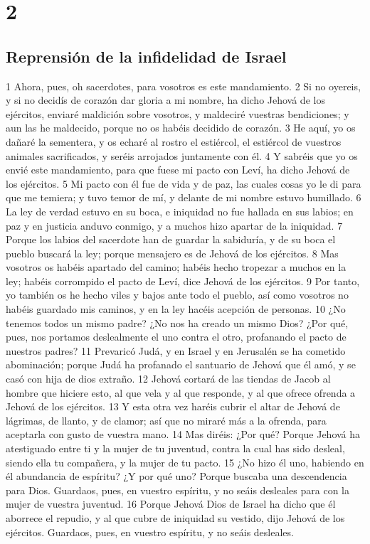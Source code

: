 \chapter{2}

\section*{Reprensión de la infidelidad de Israel}

1 Ahora, pues, oh sacerdotes, para vosotros es este mandamiento.
2 Si no oyereis, y si no decidís de corazón dar gloria a mi nombre, ha dicho Jehová de los ejércitos, enviaré maldición sobre vosotros, y maldeciré vuestras bendiciones; y aun las he maldecido, porque no os habéis decidido de corazón.
3 He aquí, yo os dañaré la sementera, y os echaré al rostro el estiércol, el estiércol de vuestros animales sacrificados, y seréis arrojados juntamente con él.
4 Y sabréis que yo os envié este mandamiento, para que fuese mi pacto con Leví, ha dicho Jehová de los ejércitos.
5 Mi pacto con él fue de vida y de paz, las cuales cosas yo le di para que me temiera; y tuvo temor de mí, y delante de mi nombre estuvo humillado.
6 La ley de verdad estuvo en su boca, e iniquidad no fue hallada en sus labios; en paz y en justicia anduvo conmigo, y a muchos hizo apartar de la iniquidad.
7 Porque los labios del sacerdote han de guardar la sabiduría, y de su boca el pueblo buscará la ley; porque mensajero es de Jehová de los ejércitos.
8 Mas vosotros os habéis apartado del camino; habéis hecho tropezar a muchos en la ley; habéis corrompido el pacto de Leví, dice Jehová de los ejércitos.
9 Por tanto, yo también os he hecho viles y bajos ante todo el pueblo, así como vosotros no habéis guardado mis caminos, y en la ley hacéis acepción de personas. 
10 ¿No tenemos todos un mismo padre? ¿No nos ha creado un mismo Dios? ¿Por qué, pues, nos portamos deslealmente el uno contra el otro, profanando el pacto de nuestros padres?
11 Prevaricó Judá, y en Israel y en Jerusalén se ha cometido abominación; porque Judá ha profanado el santuario de Jehová que él amó, y se casó con hija de dios extraño.
12 Jehová cortará de las tiendas de Jacob al hombre que hiciere esto, al que vela y al que responde, y al que ofrece ofrenda a Jehová de los ejércitos.
13 Y esta otra vez haréis cubrir el altar de Jehová de lágrimas, de llanto, y de clamor; así que no miraré más a la ofrenda, para aceptarla con gusto de vuestra mano.
14 Mas diréis: ¿Por qué? Porque Jehová ha atestiguado entre ti y la mujer de tu juventud, contra la cual has sido desleal, siendo ella tu compañera, y la mujer de tu pacto.
15 ¿No hizo él uno, habiendo en él abundancia de espíritu? ¿Y por qué uno? Porque buscaba una descendencia para Dios. Guardaos, pues, en vuestro espíritu, y no seáis desleales para con la mujer de vuestra juventud.
16 Porque Jehová Dios de Israel ha dicho que él aborrece el repudio, y al que cubre de iniquidad su vestido, dijo Jehová de los ejércitos. Guardaos, pues, en vuestro espíritu, y no seáis desleales.

